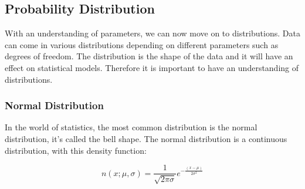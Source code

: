 \subsection{Probability Distribution}
With an understanding of parameters, we can now move on to distributions. Data can come in various distributions depending on different parameters such
as degrees of freedom. The distribution is the shape of the data and it will have
an effect on statistical models. Therefore it is important to have an understanding of distributions.
\subsubsection{Normal Distribution}

In the world of statistics, the most common distribution is the normal distribution, it's called the bell shape. The normal distribution is a continuous distribution, with this density function:

\begin{equation}
n(x;\mu,\sigma) =\frac{1}{\sqrt{2\pi\sigma}}e^{-\frac{(x-\mu)}{2\sigma^2}}
\end{equation}

